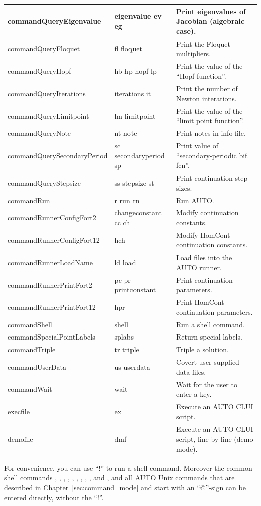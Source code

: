 \documentclass[12pt]{report}
\begin{document}
\begin{longtable}{|l|p{1.5in}|p{2in}|}
commandQueryEigenvalue & eigenvalue ev eg  & Print eigenvalues of Jacobian (algebraic case).\\ \hline 
commandQueryFloquet & fl floquet  & Print the Floquet multipliers.\\ \hline 
commandQueryHopf & hb hp hopf lp  & Print the value of the ``Hopf function''.\\ \hline 
commandQueryIterations & iterations it  & Print the number of Newton interations.\\ \hline 
commandQueryLimitpoint & lm limitpoint  & Print the value of the ``limit point function''.\\ \hline 
commandQueryNote & nt note  & Print notes in info file.\\ \hline 
commandQuerySecondaryPeriod & sc secondaryperiod sp  & Print value of ``secondary-periodic bif. fcn''.\\ \hline 
commandQueryStepsize & ss stepsize st  & Print continuation step sizes.\\ \hline 
commandRun & r run rn  & Run AUTO.\\ \hline 
commandRunnerConfigFort2 & changeconstant cc ch  & Modify continuation constants.\\ \hline 
commandRunnerConfigFort12 & hch  & Modify HomCont continuation constants.\\ \hline 
commandRunnerLoadName & ld load  & Load files into the AUTO runner.\\ \hline 
commandRunnerPrintFort2 & pc pr printconstant  & Print continuation parameters.\\ \hline 
commandRunnerPrintFort12 & hpr & Print HomCont continuation parameters.\\ \hline 
commandShell & shell  & Run a shell command.\\ \hline 
commandSpecialPointLabels & splabs & Return special labels.\\ \hline
commandTriple & tr triple  & Triple a solution.\\ \hline 
commandUserData & us userdata  & Covert user-supplied data files.\\ \hline 
commandWait & wait  & Wait for the user to enter a key.\\ \hline 
execfile & ex  & Execute an AUTO CLUI script.\\ \hline
demofile & dmf & Execute an AUTO CLUI script, line by line (demo
mode). \\ \hline
\end{longtable}
For convenience, you can use ``!'' to run a shell command. Moreover
the common shell commands , ,
, ,
, , , ,
, and , and all AUTO Unix commands that are described
in Chapter~\ref{sec:command_mode} and start with an ``@''-sign can be
entered directly, without the ``!''.
\pagebreak
\end{document}
